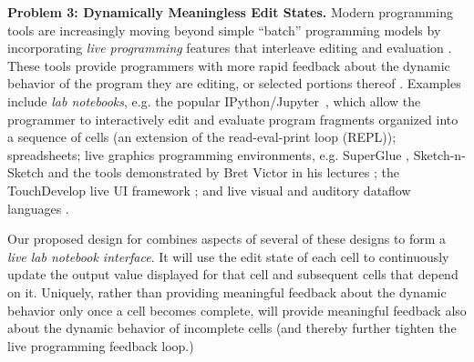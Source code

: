 \vspace{0.25ex}
\noindent\textbf{Problem 3: Dynamically Meaningless Edit States.} Modern programming
tools are increasingly moving beyond simple ``batch'' programming models by
incorporating \emph{live programming} features that interleave editing and
evaluation \cite{DBLP:conf/icse/Tanimoto13,DBLP:journals/vlc/Tanimoto90,McDirmid:2007:LUL:1297105.1297073}. These tools provide programmers with more rapid feedback about the
dynamic behavior of the program they are editing, or selected portions thereof \cite{McDirmid:2013:ULP:2509578.2509585}. Examples include \emph{lab notebooks},
e.g. the popular IPython/Jupyter~\cite{Perez:2007:ISI:1251563.1251831}, which allow the
programmer to interactively edit and evaluate program fragments organized into a
sequence of cells (an extension of the read-eval-print loop (REPL)); spreadsheets; {live graphics programming environments}, e.g. SuperGlue \cite{McDirmid:2007:LUL:1297105.1297073}, Sketch-n-Sketch \cite{DBLP:conf/pldi/ChughHSA16,DBLP:conf/icse/Chugh25} and the tools demonstrated by Bret Victor in his lectures \cite{victor2012inventing}; the TouchDevelop live UI framework \cite{burckhardt2013s}; and live visual and auditory dataflow languages \cite{DBLP:conf/vl/BurnettAW98}. 

Our proposed design for \HazelEnv combines aspects of several of these designs to form a \emph{live lab notebook interface}. 
It will use the edit state of each cell to continuously update the output
value displayed for that cell and subsequent cells that depend on
it. Uniquely, rather than providing meaningful feedback about the dynamic
behavior only once a cell becomes complete, \HazelEnv will provide meaningful feedback also
about the dynamic behavior of incomplete cells (and thereby further tighten the live programming 
feedback loop.)

